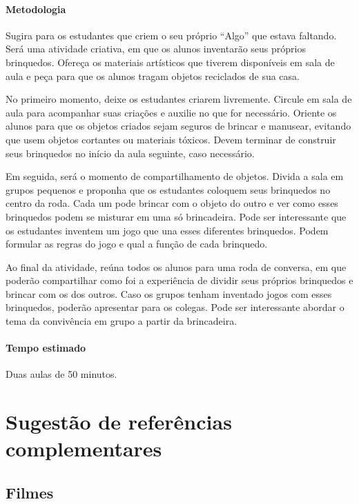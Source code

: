 \documentclass[11pt]{extarticle}
\begin{document}
\paragraph{Metodologia} Sugira para os estudantes que criem o seu próprio ``Algo'' que estava faltando. Será uma atividade criativa, em que os alunos inventarão seus próprios brinquedos. Ofereça os materiais artísticos que tiverem disponíveis em sala de aula e peça para que os alunos tragam objetos reciclados de sua casa.


No primeiro momento, deixe os estudantes criarem livremente. Circule em sala de aula para acompanhar suas criações e auxilie no que for necessário. Oriente os alunos para que os objetos criados sejam seguros de brincar e manusear, evitando que usem objetos cortantes ou materiais tóxicos. Devem terminar de construir seus brinquedos no início da aula seguinte, caso necessário.

Em seguida, será o momento de compartilhamento de objetos. Divida a sala em grupos pequenos e proponha que os estudantes coloquem seus brinquedos no centro da roda. Cada um pode brincar com o objeto do outro e ver como esses brinquedos podem se misturar em uma só brincadeira. Pode ser interessante que os estudantes inventem um jogo que una esses diferentes brinquedos. Podem formular as regras do jogo e qual a função de cada brinquedo.

Ao final da atividade, reúna todos os alunos para uma roda de conversa, em que poderão compartilhar como foi a experiência de dividir seus próprios brinquedos e brincar com os dos outros. Caso os grupos tenham inventado jogos com esses brinquedos, poderão apresentar para os colegas. Pode ser interessante abordar o tema da convivência em grupo a partir da brincadeira.

\paragraph{Tempo estimado} Duas aulas de 50 minutos.

\section{Sugestão de referências complementares}

\subsection{Filmes}
\end{document}
